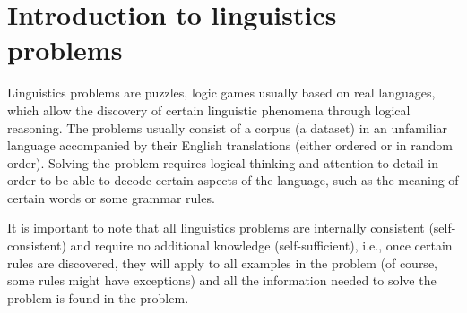 \hypertarget{intro}{%
\chapter{Introduction to linguistics problems}\label{chap-intro}}
Linguistics problems are puzzles, logic games usually based on real languages, which allow the discovery of certain linguistic phenomena through logical reasoning. The problems usually consist of a corpus (a dataset) in an unfamiliar language accompanied by their English translations (either ordered or in random order). Solving the problem requires logical thinking and attention to detail in order to be able to decode certain aspects of the language, such as the meaning of certain words or some grammar rules.

It is important to note that all linguistics problems are internally consistent (self-consistent) and require no additional knowledge (self-sufficient), i.e., once certain rules are discovered, they will apply to all examples in the problem (of course, some rules might have exceptions) and all the information needed to solve the problem is found in the problem.

